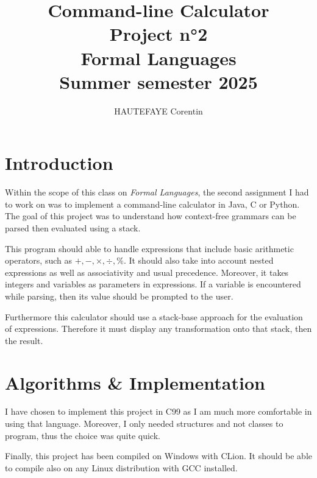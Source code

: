 \documentclass[a4paper,11pt,titlepage]{article}
\title{
    \Huge{Command-line Calculator} \\
    \Large{Project n°2} \\
    \vspace{1cm} 
    \large{Formal Languages} \\
    \large{Summer semester 2025}
}
\author{HAUTEFAYE Corentin}
\date{}
\begin{document}

\maketitle
\newpage

\tableofcontents
\newpage
\section{Introduction}
Within the scope of this class on \textit{Formal Languages}, the second assignment I had to work on was to implement a command-line calculator in Java, C or Python. The goal of this project was to understand how context-free grammars can be parsed then evaluated using a stack.

This program should able to handle expressions that include basic arithmetic operators, such as $+, -, \times,\div,\%$. It should also take into account nested expressions as well as associativity and usual precedence. Moreover, it takes integers and variables as parameters in expressions. If a variable is encountered while parsing, then its value should be prompted to the user.

Furthermore this calculator should use a stack-base approach for the evaluation of expressions. Therefore it must display any transformation onto that stack, then the result.

\section{Algorithms \& Implementation}
I have chosen to implement this project in C99 as I am much more comfortable in using that language. Moreover, I only needed structures and not classes to program, thus the choice was quite quick.

Finally, this project has been compiled on Windows with CLion. It should be able to compile also on any Linux distribution with GCC installed.
\end{document}
